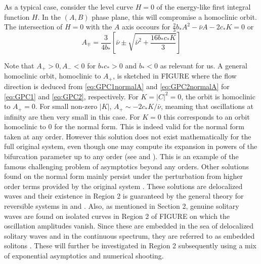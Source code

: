 As a typical case, consider  the level curve $H=0$ of the energy-like first integral function $H$. In the $(A,B)$ phase plane,
this will compromise a homoclinic orbit. The intersection of $H=0$ with the $A$ axis occours for $ \frac{2}{3} b_* A^2 - \bar{\nu}A - 2 c_* K = 0$ or
\begin{equation}
A_{\mp} = \frac{3}{4 b_*} \left[ \bar{\nu} \pm \sqrt{ \bar{\nu}^2 + \frac{16 b_* c_* K}{3} } \right]
\end{equation}

Note that $A_+ > 0, A_- < 0 $ for $b_* c_* > 0 $ and $b_* < 0$ as relevant for us. A general homoclinic orbit, homoclinic to $A_+$, is sketched
in FIGURE where the flow direction is deduced from \eqref{eq:GPC1normalA} and \eqref{eq:GPC2normalA} for \eqref{eq:GPC1} and \eqref{eq:GPC2}, respectively.
For $K=\left|C\right|^2 = 0 $, the orbit is homoclinic to $A_+=0$. For small non-zero $\left|K\right|$, $ A_+ \sim - 2 c_* K / \bar{\nu}$, meaming that
oscillations at infinity are then very small in this case. For $K=0$ this corresponds to an orbit homoclinic to 0 for the normal form. This is indeed valid for
the normal form taken at any order. However this solution does not exist mathematically for the full original system, even though
one may compute its expansion in powers of the bifurcation parameter up to any order (see \cite{Lombardi1} and \cite{Lombardi2}). This is an example
of the famous challenging problem of asymptotics beyond any orders. Other solutions found on the normal form mainly persist under the perturbation from
higher order terms provided by the original system \cite{IK}. These solutions are delocalized waves and their existence in Region 2 is guaranteed
by the general theory for reversible systems in \cite{Lombardi1} and \cite{Lombardi2}. Also, as mentioned in Section 2, genuine solitary waves are found on isolated
curves in Region 2 of FIGURE on which the oscillation amplitudes vanish. Since these are embedded in the sea of delocalized solitary waves and in the 
continuous spectrum, they are referred to as embedded solitons \cite{CMYK}. These will further be investigated in Region 2 subsequently using a mix of
exponential asymptotics and numerical shooting.


